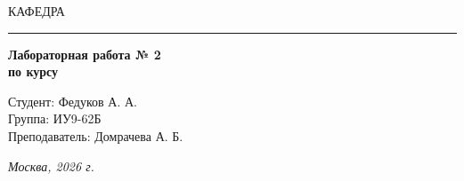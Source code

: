 \begin{titlepage}
  \vspace{0.5ex}
  \hspace{-35pt} \noindent \small КАФЕДРА\hspace{50pt} 

  \vspace*{-16pt}
  \hspace{30pt}\rule{0.866\textwidth}{0.4pt}

  \vspace{11em}

  \begin{center}
    \Large {\bf Лабораторная работа № 2} \\
    \large {\bf по курсу } \\
    \large {}

  \end{center}\normalsize

  \vspace{8em}

  \begin{flushright}
    \begin{minipage}{0.5\linewidth}
      {Студент: Федуков А. А. \hspace*{15pt}\\
        Группа: ИУ9-62Б \\
        Преподаватель: Домрачева А. Б.\hspace*{15pt}}
    \end{minipage}
  \end{flushright}
  \bigskip
  \vfill

  \begin{center}
    \textsl{Москва, 2026 г.}
  \end{center}
\end{titlepage}
